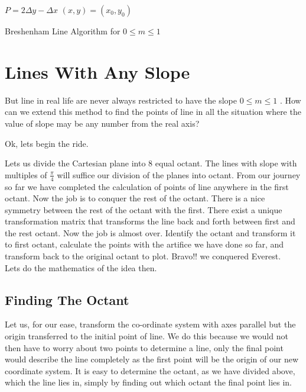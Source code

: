 \documentclass[a4paper,12pt,oneside]{book}
\begin{document}
\begin{algorithm}[H]
		
	\SetAlgoLined
	$P=2\Delta y-\Delta x$\;
	$(x,y)=(x_0,y_0)$\;
	\caption{Breshenham Line Algorithm for $0 \leq m  \leq 1$}
\end{algorithm}


\section{Lines With Any Slope}

But line in real life are never always restricted to have the slope  $0\leq m\leq 1$  . How can we extend this method to find the points of line in all the situation where the value of slope may be any number from the real axis?

Ok, lets begin the ride.

Lets us divide the Cartesian plane into 8 equal octant. The lines with slope with multiples of $\frac{\pi}{4}$ will suffice our division of the planes into octant. From our journey so far we have completed the calculation of points of line anywhere in the first octant. Now the job is to conquer the rest of the octant. There is a nice symmetry between the rest of the octant with the first. There exist a unique transformation matrix that transforms the line back and forth between first and the rest octant. Now the job is almost over. 
Identify the octant and transform it to first octant, calculate the points with the artifice we have done so far, and transform back to the original octant to plot.
Bravo!! we conquered Everest.\\
Lets do the mathematics of the idea then.
\subsection{Finding The Octant}
Let us, for our ease, transform the co-ordinate system with axes parallel but the origin transferred to the initial point of line. We do this because we would not then have to worry about two points to determine a line, only the final point would describe the line completely as the first point will be the origin of our new coordinate system. 
It is easy to determine the octant, as we have divided above, which the line lies in, simply by finding out which octant the final point lies in. 
\end{document}
